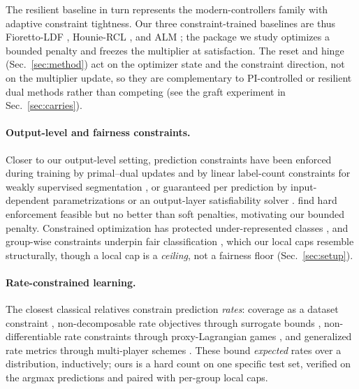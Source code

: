 \documentclass[10pt]{article}
\begin{document}
The resilient baseline { in turn}
represents the modern-controllers family with adaptive constraint
tightness. %
{Our three constraint-trained baselines are thus Fioretto-LDF
\citep{fioretto2020lagrangian}, Hounie-RCL \citep{hounie2023resilient}, and ALM
\citep{bertsekas1982constrained}};
the package we study optimizes a bounded penalty and freezes the
multiplier at satisfaction. The reset and hinge {(Sec.~\ref{sec:method}) act} on the optimizer state and the constraint
direction, not on the multiplier update{, so they are complementary} to PI-controlled or resilient dual methods rather than
competing (see the graft experiment in Sec.~\ref{sec:carries}).

\paragraph{Output-level and fairness constraints.}
Closer to our output-level setting, prediction constraints have been enforced
during training by primal--dual updates \citep{nandwani2019primal} and by
linear label-count constraints for weakly supervised segmentation
\citep{pathak2015constrained}, or guaranteed per prediction by
input-dependent parametrizations \citep{brosowsky2021sample} or an
output-layer satisfiability solver \citep{goyal2024deepsade}.
\citet{marquez2017imposing} find hard enforcement feasible but no better than
soft penalties, motivating our bounded penalty. Constrained optimization has
protected under-represented classes \citep{sangalli2021constrained}, and
group-wise constraints underpin fair classification
\citep{bilal2015fairness,agarwal2018reductions,kearns2018preventing,donini2018empirical},
which our local caps resemble structurally, though a local cap is a
\emph{ceiling}, not a fairness floor (Sec.~\ref{sec:setup}).

\paragraph{Rate-constrained learning.}
The closest classical relatives constrain prediction \emph{rates}:
coverage as a dataset constraint \citep{goh2016satisfying}, non-decomposable
rate objectives through surrogate bounds \citep{eban2017scalable},
non-differentiable rate constraints through proxy-Lagrangian games
\citep{cotter2019optimization}, and generalized rate metrics through
multi-player schemes \citep{narasimhan2019optimizing}. These bound
\emph{expected} rates over a distribution, inductively; ours is a hard count
on one specific test set, verified on the argmax predictions and paired with
per-group local caps.
\end{document}
